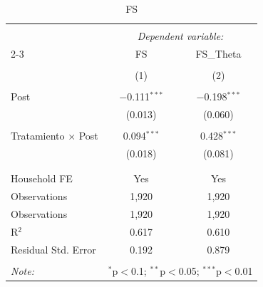 
\begin{table}[H] \centering 
  \caption{FS} 
  \label{reg_FS} 
\tiny 
\begin{tabular}{@{\extracolsep{-7pt}}lcc} 
\\[-1.8ex]\hline 
\hline \\[-1.8ex] 
 & \multicolumn{2}{c}{\textit{Dependent variable:}} \\ 
\cline{2-3} 
 & FS & FS_Theta \\ 
\\[-1.8ex] & (1) & (2)\\ 
\hline \\[-1.8ex] 
 Post & $-$0.111$^{***}$ & $-$0.198$^{***}$ \\ 
  & (0.013) & (0.060) \\ 
  & & \\ 
 Tratamiento × Post & 0.094$^{***}$ & 0.428$^{***}$ \\ 
  & (0.018) & (0.081) \\ 
  & & \\ 
\hline \\[-1.8ex] 
Household FE & Yes & Yes \\ 
Observations & 1,920 & 1,920 \\ 
Observations & 1,920 & 1,920 \\ 
R$^{2}$ & 0.617 & 0.610 \\ 
Residual Std. Error & 0.192 & 0.879 \\ 
\hline 
\hline \\[-1.8ex] 
\textit{Note:}  & \multicolumn{2}{r}{$^{*}$p$<$0.1; $^{**}$p$<$0.05; $^{***}$p$<$0.01} \\ 
\end{tabular} 
\end{table} 
